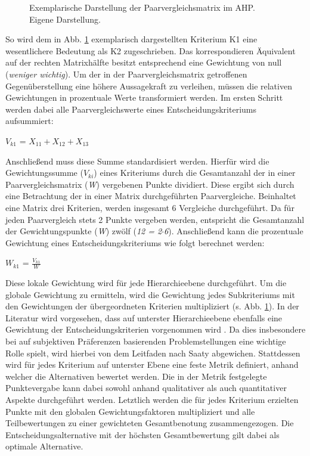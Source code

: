 \begin{center}
	\begin{figure}[H]
		\centering
		\caption[Exemplarische Darstellung der Paarvergleichsmatrix im AHP]{Exemplarische Darstellung der Paarvergleichsmatrix im AHP.\\ Eigene Darstellung.}
		\label{fig:AHP_B}
	\end{figure}
\end{center}
\vspace*{-10mm}
So wird dem in Abb. \ref*{fig:AHP_B} exemplarisch dargestellten Kriterium K1 eine wesentlichere Bedeutung als K2 zugeschrieben. Das korrespondieren Äquivalent auf der rechten Matrixhälfte besitzt entsprechend eine Gewichtung von null (\textit{weniger wichtig}). Um der in der Paarvergleichsmatrix getroffenen Gegenüberstellung eine höhere Aussagekraft zu verleihen, müssen die relativen Gewichtungen in prozentuale Werte transformiert werden. Im ersten Schritt werden dabei alle Paarvergleichswerte eines Entscheidungskriteriums aufsummiert:\\
 \vspace{-6mm}
 \begin{center}
	$V_{k1}$ = $X_{11}+X_{12}+X_{13}$	
 \end{center}
Anschließend muss diese Summe standardisiert werden. Hierfür wird die Gewichtungssumme ($V_{ki}$) eines Kriteriums durch die Gesamtanzahl der in einer Paarvergleichsmatrix (\textit{W}) vergebenen Punkte dividiert. Diese ergibt sich durch eine Betrachtung der in einer Matrix durchgeführten Paarvergleiche. Beinhaltet eine Matrix drei Kriterien, werden insgesamt 6 Vergleiche durchgeführt. Da für jeden Paarvergleich stets 2 Punkte vergeben werden, entspricht die Gesamtanzahl der Gewichtungspunkte (\textit{W}) zwölf (\textit{12 = 2$\cdot$6}). Anschließend kann die prozentuale Gewichtung eines Entscheidungskriteriums wie folgt berechnet werden:
 \vspace{-2mm}
 \begin{center}
	$W_{k1}$ = $\frac{V_{k1}}{W}$	
 \end{center}
Diese lokale Gewichtung wird für jede Hierarchieebene durchgeführt. Um die globale Gewichtung zu ermitteln, wird die Gewichtung jedes Subkriteriums mit den Gewichtungen der übergeordneten Kriterien  multipliziert (s. Abb. \ref*{fig:AHP_B}).
In der Literatur wird vorgesehen, dass auf unterster Hierarchieebene ebenfalls eine Gewichtung der Entscheidungskriterien vorgenommen wird \cite[86]{Saaty.2008}. Da dies insbesondere bei auf subjektiven Präferenzen basierenden Problemstellungen eine wichtige Rolle spielt, wird hierbei von dem Leitfaden nach Saaty abgewichen. Stattdessen wird für jedes Kriterium auf unterster Ebene eine feste Metrik definiert, anhand welcher die Alternativen bewertet werden. Die in der Metrik festgelegte Punktevergabe kann dabei sowohl anhand qualitativer als auch quantitativer Aspekte durchgeführt werden. Letztlich werden die für jedes Kriterium erzielten Punkte mit den globalen Gewichtungsfaktoren multipliziert und alle Teilbewertungen zu einer gewichteten Gesamtbenotung zusammengezogen. Die Entscheidungsalternative mit der höchsten Gesamtbewertung gilt dabei als optimale Alternative. 
